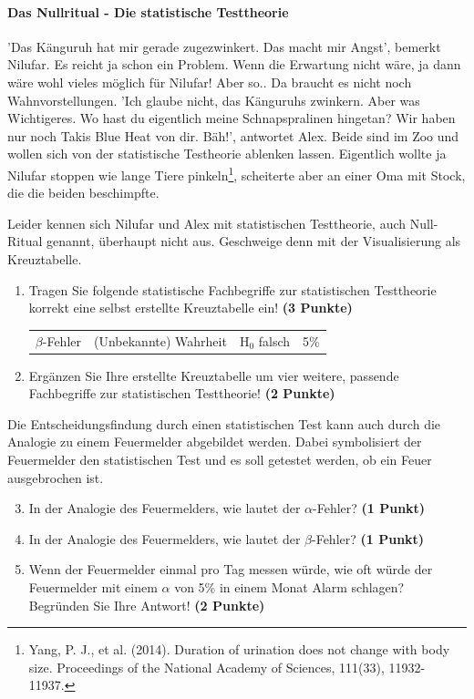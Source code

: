 \documentclass[a4paper, 9pt]{scrartcl}\usepackage[]{graphicx}\usepackage[]{xcolor}
\begin{document}
\ifcollection
\paragraph{Das Nullritual - Die statistische Testtheorie}
\fi

'Das Känguruh hat mir gerade zugezwinkert. Das macht mir Angst', bemerkt Nilufar. Es reicht ja schon ein Problem. Wenn die Erwartung nicht wäre, ja dann wäre wohl vieles möglich für Nilufar! Aber so.. Da braucht es nicht noch Wahnvorstellungen. 'Ich glaube nicht, das Känguruhs zwinkern. Aber was Wichtigeres. Wo hast du eigentlich meine Schnapspralinen hingetan? Wir haben nur noch Takis Blue Heat von dir. Bäh!', antwortet Alex. Beide sind im Zoo und wollen sich von der statistische Testheorie ablenken lassen. Eigentlich wollte ja Nilufar stoppen wie lange Tiere pinkeln\footnote{Yang, P. J., et al. (2014). Duration of urination does not change with body size. Proceedings of the National Academy of Sciences, 111(33), 11932-11937.}, scheiterte aber an einer Oma mit Stock, die die beiden beschimpfte.

\vspace{1ex}

Leider kennen sich Nilufar und Alex mit statistischen Testtheorie, auch Null-Ritual genannt, überhaupt nicht aus. Geschweige denn mit der Visualisierung als Kreuztabelle.  

\begin{enumerate}
\item Tragen Sie folgende statistische Fachbegriffe zur statistischen Testtheorie korrekt eine selbst erstellte Kreuztabelle ein! \textbf{(3 Punkte)}
  \begin{center}
  \begin{tabular}{cccc}
  $\beta$-Fehler & (Unbekannte) Wahrheit & H$_0$ falsch & 5\% \\
  \end{tabular}
  \end{center}
\item Ergänzen Sie Ihre erstellte Kreuztabelle um vier weitere, passende Fachbegriffe zur statistischen Testtheorie! \textbf{(2 Punkte)}
\end{enumerate}

Die Entscheidungsfindung durch einen statistischen Test kann auch durch die Analogie zu einem Feuermelder abgebildet werden. Dabei symbolisiert der Feuermelder den statistischen Test und es soll getestet werden, ob ein Feuer ausgebrochen ist.

\begin{enumerate}
  \setcounter{enumi}{2}    
\item In der Analogie des Feuermelders, wie lautet der $\alpha$-Fehler? \textbf{(1 Punkt)}
\item In der Analogie des Feuermelders, wie lautet der $\beta$-Fehler? \textbf{(1 Punkt)}
\item Wenn der Feuermelder einmal pro Tag messen würde, wie oft würde der Feuermelder mit einem $\alpha$ von 5\% in einem Monat Alarm schlagen? Begründen Sie Ihre Antwort! \textbf{(2 Punkte)}
\end{enumerate}
\end{document}
